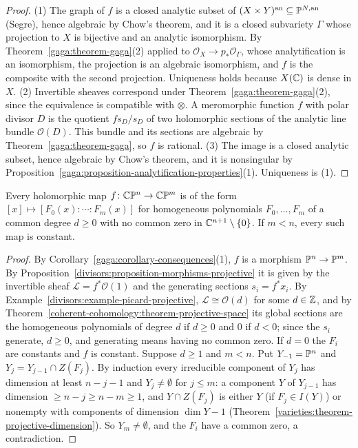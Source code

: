 \begin{proof}
(1) The graph of $f$ is a closed analytic subset of $(X \times Y)^{\mathrm{an}} \subseteq \mathbb{P}^{N,\mathrm{an}}$ (Segre), hence algebraic by Chow's theorem, and it is a
closed subvariety $\Gamma$ whose projection to $X$ is bijective and an analytic isomorphism. By Theorem~\ref{gaga:theorem-gaga}(2) applied to
$\mathcal{O}_X \to p_*\mathcal{O}_\Gamma$, whose analytification is an isomorphism, the projection is an algebraic isomorphism, and $f$ is the composite with the second
projection. Uniqueness holds because $X(\mathbb{C})$ is dense in $X$. (2) Invertible sheaves correspond under Theorem~\ref{gaga:theorem-gaga}(2), since the equivalence is
compatible with $\otimes$. A meromorphic function $f$ with polar divisor $D$ is the quotient $fs_D/s_D$ of two holomorphic sections of the analytic line bundle
$\mathcal{O}(D)$. This bundle and its sections are algebraic by Theorem~\ref{gaga:theorem-gaga}, so $f$ is rational. (3) The image is a closed analytic
subset, hence algebraic by Chow's theorem, and it is nonsingular by Proposition~\ref{gaga:proposition-analytification-properties}(1). Uniqueness is (1).
\end{proof}

\begin{corollary}\label{gaga:corollary-maps-projective-spaces}
Every holomorphic map $f \colon \mathbb{C}\mathbb{P}^n \to \mathbb{C}\mathbb{P}^m$ is of the form $[x] \mapsto [F_0(x) : \cdots : F_m(x)]$ for homogeneous polynomials $F_0, \ldots, F_m$ of a common degree $d \geq 0$ with no common zero in
$\mathbb{C}^{n+1} \setminus \{0\}$. If $m < n$, every such map is constant.
\end{corollary}

\begin{proof}
By Corollary~\ref{gaga:corollary-consequences}(1), $f$ is a morphism $\mathbb{P}^n \to \mathbb{P}^m$. By Proposition~\ref{divisors:proposition-morphisms-projective} it is given by the invertible sheaf $\mathcal{L} = f^*\mathcal{O}(1)$ and the
generating sections $s_i = f^*x_i$. By Example~\ref{divisors:example-picard-projective}, $\mathcal{L} \cong \mathcal{O}(d)$ for some $d \in \mathbb{Z}$, and by Theorem~\ref{coherent-cohomology:theorem-projective-space} its global
sections are the homogeneous polynomials of degree $d$ if $d \geq 0$ and $0$ if $d < 0$; since the $s_i$ generate, $d \geq 0$, and generating means having no common zero. If $d = 0$ the $F_i$ are constants and $f$ is constant.
Suppose $d \geq 1$ and $m < n$. Put $Y_{-1} = \mathbb{P}^n$ and $Y_j = Y_{j-1} \cap Z(F_j)$. By induction every irreducible component of $Y_j$ has dimension at least $n - j - 1$ and $Y_j \neq \emptyset$ for $j \leq m$: a component $Y$ of
$Y_{j-1}$ has dimension $\geq n - j \geq n - m \geq 1$, and $Y \cap Z(F_j)$ is either $Y$ (if $F_j \in I(Y)$) or nonempty with components of dimension $\dim Y - 1$ (Theorem~\ref{varieties:theorem-projective-dimension}).
So $Y_m \neq \emptyset$, and the $F_i$ have a common zero, a contradiction.
\end{proof}

